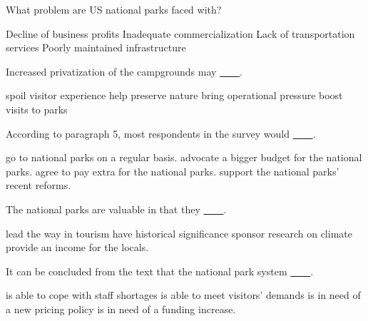 \item What problem are US national parks faced with?
\begin{tasks}
	\task Decline of business profits
	\task Inadequate commercialization
	\task Lack of transportation services
	\task Poorly maintained infrastructure
\end{tasks}
\item Increased privatization of the campgrounds may \uline{~~~~}.
\begin{tasks}
	\task spoil visitor experience
	\task help preserve nature
	\task bring operational pressure
	\task boost visits to parks
\end{tasks}
\item According to paragraph 5, most respondents in the survey would \uline{~~~~}.
\begin{tasks}
	\task go to national parks on a regular basis.
	\task advocate a bigger budget for the national parks.
	\task agree to pay extra for the national parks.
	\task support the national parks' recent reforms.
\end{tasks}
\item The national parks are valuable in that they \uline{~~~~}.
\begin{tasks}
	\task lead the way in tourism
	\task have historical significance
	\task sponsor research on climate
	\task provide an income for the locals.
\end{tasks}
\item It can be concluded from the text that the national park system \uline{~~~~}.
\begin{tasks}
	\task is able to cope with staff shortages
	\task is able to meet visitors' demands
	\task is in need of a new pricing policy
	\task is in need of a funding increase.
\end{tasks}
